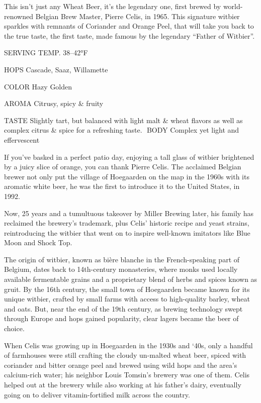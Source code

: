 \documentclass[a4paper,parskip=half]{scrartcl}
\begin{document}
\parencite{CelisBrewery2021}

This isn’t just any Wheat Beer, it’s the legendary one, first brewed by world-renowned Belgian Brew Master, Pierre Celis, in 1965. This signature witbier sparkles with remnants of Coriander and Orange Peel, that will take you back to the true taste, the first taste, made famous by the legendary “Father of Witbier”.

SERVING
TEMP.
38–42°F

HOPS
Cascade, Saaz, Willamette

COLOR
Hazy Golden

AROMA
Citrusy, spicy \& fruity

TASTE
Slightly tart, but balanced with light malt \& wheat flavors as well as complex citrus \& spice for a refreshing taste.
​
​BODY
Complex yet light and effervescent

\parencite{Meewes2017}

If you’ve basked in a perfect patio day, enjoying a tall glass of witbier brightened by a juicy slice of orange, you can thank Pierre Celis. The acclaimed Belgian brewer not only put the village of Hoegaarden on the map in the 1960s with its aromatic white beer, he was the first to introduce it to the United States, in 1992.

Now, 25 years and a tumultuous takeover by Miller Brewing later, his family has reclaimed the brewery’s trademark, plus Celis’ historic recipe and yeast strains, reintroducing the witbier that went on to inspire well-known imitators like Blue Moon and Shock Top.

The origin of witbier, known as bière blanche in the French-speaking part of Belgium, dates back to 14th-century monasteries, where monks used locally available fermentable grains and a proprietary blend of herbs and spices known as gruit. By the 16th century, the small town of Hoegaarden became known for its unique witbier, crafted by small farms with access to high-quality barley, wheat and oats. But, near the end of the 19th century, as brewing technology swept through Europe and hops gained popularity, clear lagers became the beer of choice.

When Celis was growing up in Hoegaarden in the 1930s and ‘40s, only a handful of farmhouses were still crafting the cloudy un-malted wheat beer, spiced with coriander and bitter orange peel and brewed using wild hops and the area’s calcium-rich water; his neighbor Louis Tomsin’s brewery was one of them. Celis helped out at the brewery while also working at his father’s dairy, eventually going on to deliver vitamin-fortified milk across the country.
\end{document}
